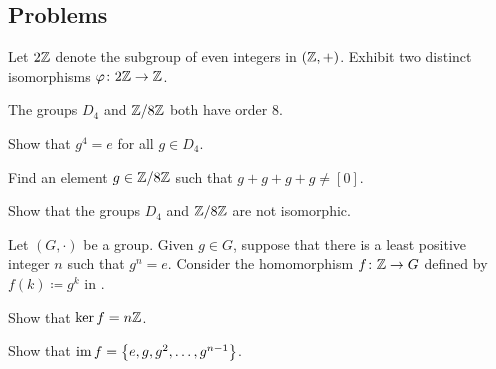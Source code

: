 \documentclass[../main.tex]{subfiles}
\begin{document}
\subsection{Problems}


\begin{homework}
    Let $2\mathbb Z$ denote the subgroup of even integers in $(\mathbb Z,+)$. Exhibit two distinct isomorphisms $\varphi\colon2\mathbb Z\to\mathbb Z$.
\end{homework}

\begin{homework} \label{prob:groups-of-order-8}
    The groups $D_4$ and $\mathbb Z/8\mathbb Z$ both have order $8$.
    \begin{listalph}
        \item Show that $g^4=e$ for all $g\in D_4$.
        \item Find an element $g\in\mathbb Z/8\mathbb Z$ such that $g+g+g+g\ne[0]$.
        \item Show that the groups $D_4$ and $\mathbb Z/8\mathbb Z$ are not isomorphic.
    \end{listalph}
\end{homework}

\begin{homework}
    Let $(G,\cdot)$ be a group. Given $g\in G$, suppose that there is a least positive integer $n$ such that $g^n=e$. Consider the homomorphism $f\colon\mathbb Z\to G$ defined by $f(k)\coloneqq g^k$ in .
    \begin{listalph}
        \item Show that $\ker f=n\mathbb Z$.
        \item Show that $\operatorname{im} f=\left\{e,g,g^2,\ldots,g^{n-1}\right\}$.
    \end{listalph}
\end{homework}
\end{document}
